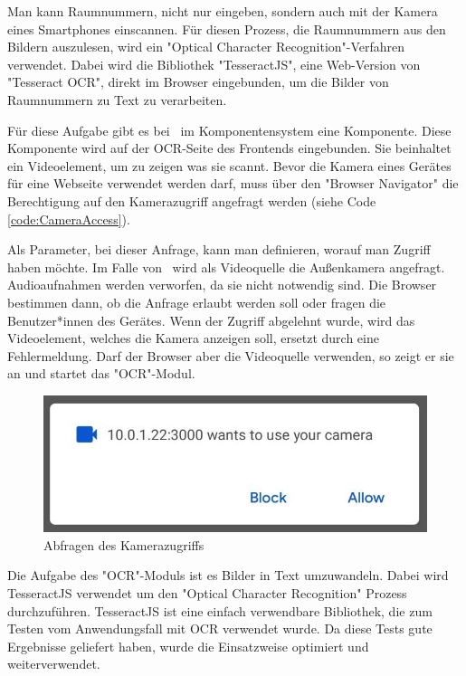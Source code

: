 
\label{sec:ocrmodul}

Man kann Raumnummern, nicht nur eingeben, sondern auch mit der Kamera eines Smartphones einscannen. Für diesen Prozess, die Raumnummern aus den Bildern auszulesen, wird ein "Optical Character Recognition"-Verfahren verwendet. Dabei wird die Bibliothek "TesseractJS", eine Web-Version von "Tesseract OCR", direkt im Browser eingebunden, um die Bilder von Raumnummern zu Text zu verarbeiten.\cite{TesseractJS}\cite{TesseractJSImplementation}

Für diese Aufgabe gibt es bei \ZELIA\ im Komponentensystem eine Komponente. Diese Komponente wird auf der OCR-Seite des Frontends eingebunden. Sie beinhaltet ein Videoelement, um zu zeigen was sie scannt. Bevor die Kamera eines Gerätes für eine Webseite verwendet werden darf, muss über den "Browser Navigator" die Berechtigung auf den Kamerazugriff angefragt werden (siehe Code \ref{code:CameraAccess}).


Als Parameter, bei dieser Anfrage, kann man definieren, worauf man Zugriff haben möchte. Im Falle von \ZELIA\ wird als Videoquelle die Außenkamera angefragt. Audioaufnahmen werden verworfen, da sie nicht notwendig sind. Die Browser bestimmen dann, ob die Anfrage erlaubt werden soll oder fragen die Benutzer*innen des Gerätes. Wenn der Zugriff abgelehnt wurde, wird das Videoelement, welches die Kamera anzeigen soll, ersetzt durch eine Fehlermeldung. Darf der Browser aber die Videoquelle verwenden, so zeigt er sie an und startet das "OCR"-Modul.

\begin{figure}[H]
    \centering
    \includegraphics[width=120mm]{media/OCR/cam_access_light.jpg}
    \caption{Abfragen des Kamerazugriffs}
\end{figure}


Die Aufgabe des "OCR"-Moduls ist es Bilder in Text umzuwandeln. Dabei wird TesseractJS verwendet um den "Optical Character Recognition" Prozess durchzuführen. TesseractJS ist eine einfach verwendbare Bibliothek, die zum Testen vom Anwendungsfall mit OCR verwendet wurde. Da diese Tests gute Ergebnisse geliefert haben, wurde die Einsatzweise optimiert und weiterverwendet.

